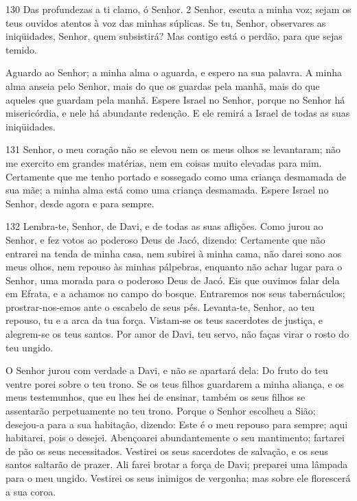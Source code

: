 \bigskip

\lettrine{130}{} Das profundezas a ti clamo, ó Senhor. 2 Senhor,
escuta a minha voz; sejam os teus ouvidos atentos à voz das minhas
súplicas. Se tu, Senhor, observares as iniqüidades, Senhor, quem
subsistirá? Mas contigo está o perdão, para que sejas temido.

Aguardo ao Senhor; a minha alma o aguarda, e espero na sua
palavra. A minha alma anseia pelo Senhor, mais do que os guardas
pela manhã, mais do que aqueles que guardam pela manhã. Espere
Israel no Senhor, porque no Senhor há misericórdia, e nele há
abundante redenção. E ele remirá a Israel de todas as suas
iniqüidades.

\bigskip

\lettrine{131}{} Senhor, o meu coração não se elevou nem os meus
olhos se levantaram; não me exercito em grandes matérias, nem em
coisas muito elevadas para mim. Certamente que me tenho portado
e sossegado como uma criança desmamada de sua mãe; a minha alma está
como uma criança desmamada. Espere Israel no Senhor, desde agora
e para sempre.

\bigskip

\lettrine{132}{} Lembra-te, Senhor, de Davi, e de todas as suas
aflições. Como jurou ao Senhor, e fez votos ao poderoso Deus de
Jacó, dizendo: Certamente que não entrarei na tenda de minha
casa, nem subirei à minha cama, não darei sono aos meus olhos,
nem repouso às minhas pálpebras, enquanto não achar lugar para o
Senhor, uma morada para o poderoso Deus de Jacó. Eis que ouvimos
falar dela em Efrata, e a achamos no campo do bosque. Entraremos
nos seus tabernáculos; prostrar-nos-emos ante o escabelo de seus
pés. Levanta-te, Senhor, ao teu repouso, tu e a arca da tua
força. Vistam-se os teus sacerdotes de justiça, e alegrem-se os
teus santos. Por amor de Davi, teu servo, não faças virar o
rosto do teu ungido.

O Senhor jurou com verdade a Davi, e não se apartará dela: Do
fruto do teu ventre porei sobre o teu trono. Se os teus
filhos guardarem a minha aliança, e os meus testemunhos, que eu lhes
hei de ensinar, também os seus filhos se assentarão perpetuamente no
teu trono. Porque o Senhor escolheu a Sião; desejou-a para a
sua habitação, dizendo: Este é o meu repouso para sempre;
aqui habitarei, pois o desejei. Abençoarei abundantemente o
seu mantimento; fartarei de pão os seus necessitados.
Vestirei os seus sacerdotes de salvação, e os seus santos
saltarão de prazer. Ali farei brotar a força de Davi;
preparei uma lâmpada para o meu ungido. Vestirei os seus
inimigos de vergonha; mas sobre ele florescerá a sua coroa.


